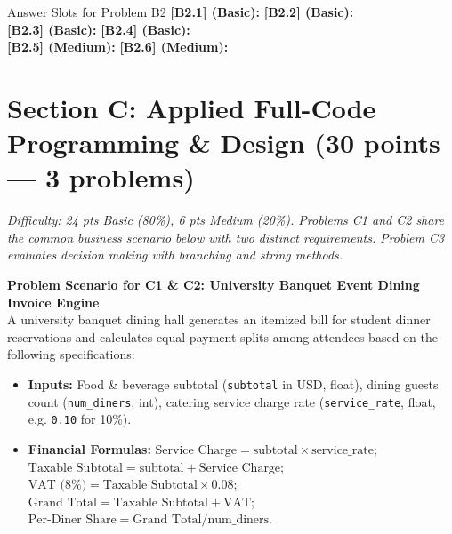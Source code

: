\documentclass[11pt,a4paper]{article}
\begin{document}
\vspace{0.6mm}
\begin{answerbox}[height=2.0cm]{Answer Slots for Problem B2}
\textbf{[B2.1] (Basic):} \dotfill \quad \textbf{[B2.2] (Basic):} \dotfill\\[1.1mm]
\textbf{[B2.3] (Basic):} \dotfill \quad \textbf{[B2.4] (Basic):} \dotfill\\[1.1mm]
\textbf{[B2.5] (Medium):} \dotfill \quad \textbf{[B2.6] (Medium):} \dotfill
\end{answerbox}

\vspace{0.8mm}
\section*{Section C: Applied Full-Code Programming \& Design \hfill \normalsize\normalfont(30 points --- 3 problems)}
\textit{Difficulty: 24 pts Basic (80\%), 6 pts Medium (20\%). Problems C1 and C2 share the common business scenario below with two distinct requirements. Problem C3 evaluates decision making with branching and string methods.}

\begin{tcolorbox}[colback=boxbg, colframe=secondaryteal, arc=1.2mm, boxrule=0.6pt, left=2.0mm, right=2.0mm, top=0.6mm, bottom=0.6mm]
\textbf{\small Problem Scenario for C1 \& C2: University Banquet Event Dining Invoice Engine}\\[0.2mm]
\footnotesize
A university banquet dining hall generates an itemized bill for student dinner reservations and calculates equal payment splits among attendees based on the following specifications:
\begin{itemize}[itemsep=0.1pt,topsep=0.1pt]
  \item \textbf{Inputs:} Food \& beverage subtotal (\texttt{subtotal} in USD, float), dining guests count (\texttt{num\_diners}, int), catering service charge rate (\texttt{service\_rate}, float, e.g. \texttt{0.10} for 10\%).
  \item \textbf{Financial Formulas:}
    $\text{Service Charge} = \text{subtotal} \times \text{service\_rate}$; \quad
    $\text{Taxable Subtotal} = \text{subtotal} + \text{Service Charge}$;\\
    $\text{VAT (8\%)} = \text{Taxable Subtotal} \times 0.08$; \quad
    $\text{Grand Total} = \text{Taxable Subtotal} + \text{VAT}$; \quad
    $\text{Per-Diner Share} = \text{Grand Total} / \text{num\_diners}$.
\end{itemize}
\end{tcolorbox}
\end{document}
